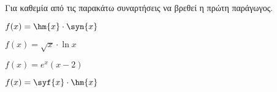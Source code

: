 Για καθεμία από τις παρακάτω συναρτήσεις να βρεθεί η πρώτη παράγωγος.
\begin{multicols}{2}
\begin{alist}
\item $ f(x)=\hm{x}\cdot\syn{x} $
\item $ f(x)=\sqrt{x}\cdot\ln{x} $
\item $ f(x)=e^x\left(x-2\right) $
\item $ f(x)=\syf{x}\cdot\hm{x} $
\end{alist}
\end{multicols}
